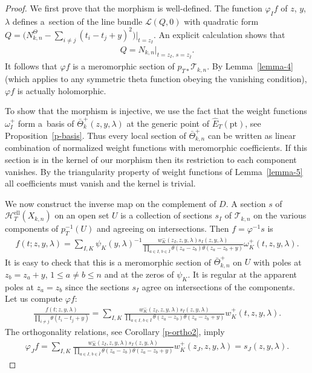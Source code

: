 \documentclass[pdftex]{sigma}
\numberwithin{equation}{section}
\begin{document}
\begin{proof} We first prove that the morphism is well-defined. The function $\varphi_If$ of $z$, $y$, $\lambda$ defines a~section of the line bundle $\mathcal L(Q,0)$ with quadratic form $Q=\Big(N^\Theta_{k,n}-\sum\limits_{i\neq j}(t_i-t_j+y)^2\Big)\big|_{t=z_I}$. An explicit calculation shows that
 \begin{gather*}
 Q=N_{k,n}|_{t=z_I,\, s=z_{\bar I}}.
 \end{gather*}
 It follows that $\varphi f$ is a meromorphic section of $p_{T*}\mathcal T_{k,n}$. By Lemma~\ref{lemma-4} (which applies to any symmetric theta function obeying the vanishing condition), $\varphi f$ is actually holomorphic.

To show that the morphism is injective, we use the fact that the weight functions $\omega_I^+$ form a~basis of $\bar\Theta^+_k(z,y,\lambda)$ at the generic point of $\hat E_T(\mathrm{pt})$, see Proposition~\ref{p-basis}. Thus every local section of $\bar\Theta^+_{k,n}$ can be written as linear combination of normalized weight functions with meromorphic coefficients. If this section is in the kernel of our morphism then its restriction to each component vanishes. By the triangularity property of weight functions of Lemma~\ref{lemma-5} all coefficients must vanish and the kernel is trivial.

 We now construct the inverse map on the complement of $D$. A section $s$ of $\mathcal H^{\mathrm{ell}}_T(X_{k,n})$ on an open set $U$ is a collection of sections $s_I$ of $\mathcal T_{k,n}$ on the various components of $p_T^{-1}(U)$ and agreeing on intersections. Then $f=\varphi^{-1}s$ is
 \begin{gather*}
 f(t;z,y,\lambda)= \sum_{I,K} \psi_K(y,\lambda)^{-1} \frac{w_K^-(z_I,z,y,\lambda)s_I(z,y,\lambda)} {\prod\limits_{a\in I,\,b\in\bar I}\theta(z_a-z_b)\theta(z_a-z_b+y)} \omega_K^+(t,z,y,\lambda).
 \end{gather*}
 It is easy to check that this is a meromorphic section of $\bar\Theta^+_{k,n}$ on $U$ with poles at $z_b=z_a+y$, $1\leq a\neq b\leq n$ and at the zeros of $\psi_K$. It is regular at the apparent poles at $z_a=z_b$ since the sections $s_I$ agree on intersections of the components. Let us compute $\varphi f$:
 \begin{gather*}
 \frac{f(t;z,y,\lambda)} {\prod\limits_{i\neq j}\theta(t_i-t_j+y)} =\sum_{I,K}\frac{w_K^-(z_I,z,y,\lambda)s_I(z,y,\lambda)} {\prod\limits_{a\in I,\,b\in\bar I}\theta(z_a-z_b)\theta(z_a-z_b+y)} w_K^+(t,z,y,\lambda).
 \end{gather*}
 The orthogonality relations, see Corollary \ref{p-ortho2}, imply
 \begin{gather*}
 \varphi_Jf =\sum_{I,K} \frac{w_K^-(z_I,z,y,\lambda) s_I(z,y,\lambda)} {\prod\limits_{a\in I,\, b\in\bar I}\theta(z_a-z_b) \theta(z_a-z_b+y)}w_K^+(z_J,z,y,\lambda) =s_J(z,y,\lambda).\tag*{\qed}
 \end{gather*}\renewcommand{\qed}{}
\end{proof}
\end{document}
